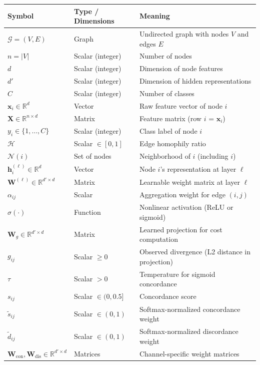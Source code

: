 \documentclass[11pt,a4paper]{article}
\newcommand{\R}{\mathbb{R}}
\newcommand{\N}{\mathcal{N}}
\newcommand{\G}{\mathcal{G}}
\newcommand{\bW}{\mathbf{W}}
\newcommand{\bx}{\mathbf{x}}
\newcommand{\bh}{\mathbf{h}}
\theoremstyle{definition}
\theoremstyle{plain}
\begin{document}
\begin{center}
\small
\renewcommand{\arraystretch}{1.3}
\begin{tabular}{lll}
\toprule
\textbf{Symbol} & \textbf{Type / Dimensions} & \textbf{Meaning} \\
\midrule
$\G = (V, E)$ & Graph & Undirected graph with nodes $V$ and edges $E$ \\
$n = |V|$ & Scalar (integer) & Number of nodes \\
$d$ & Scalar (integer) & Dimension of node features \\
$d'$ & Scalar (integer) & Dimension of hidden representations \\
$C$ & Scalar (integer) & Number of classes \\
$\bx_i \in \R^d$ & Vector & Raw feature vector of node $i$ \\
$\mathbf{X} \in \R^{n \times d}$ & Matrix & Feature matrix (row $i$ = $\bx_i$) \\
$y_i \in \{1,\ldots,C\}$ & Scalar (integer) & Class label of node $i$ \\
$\mathcal{H}$ & Scalar $\in [0,1]$ & Edge homophily ratio \\
$\N(i)$ & Set of nodes & Neighborhood of $i$ (including $i$) \\
$\bh_i^{(\ell)} \in \R^d$ & Vector & Node $i$'s representation at layer $\ell$ \\
$\bW^{(\ell)} \in \R^{d' \times d}$ & Matrix & Learnable weight matrix at layer $\ell$ \\
$\alpha_{ij}$ & Scalar & Aggregation weight for edge $(i,j)$ \\
$\sigma(\cdot)$ & Function & Nonlinear activation (ReLU or sigmoid) \\
$\bW_g \in \R^{d' \times d}$ & Matrix & Learned projection for cost computation \\
$g_{ij}$ & Scalar $\geq 0$ & Observed divergence (L2 distance in projection) \\
$\tau$ & Scalar $> 0$ & Temperature for sigmoid concordance \\
$s_{ij}$ & Scalar $\in (0,0.5]$ & Concordance score \\
$\tilde{s}_{ij}$ & Scalar $\in (0,1)$ & Softmax-normalized concordance weight \\
$\tilde{d}_{ij}$ & Scalar $\in (0,1)$ & Softmax-normalized discordance weight \\
$\bW_{\text{con}}, \bW_{\text{dis}} \in \R^{d' \times d}$ & Matrices & Channel-specific weight matrices \\

\end{tabular}
\end{center}
\end{document}
